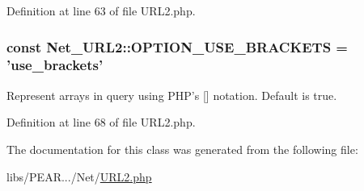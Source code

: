 Definition at line 63 of file U\-R\-L2.\-php.

\hypertarget{classNet__URL2_a864182f067e5df22055afc3a0dfe5a57}{
\subsubsection[{O\-P\-T\-I\-O\-N\-\_\-\-U\-S\-E\-\_\-\-B\-R\-A\-C\-K\-E\-T\-S}]{\setlength{\rightskip}{0pt plus 5cm}const Net\-\_\-\-U\-R\-L2\-::\-O\-P\-T\-I\-O\-N\-\_\-\-U\-S\-E\-\_\-\-B\-R\-A\-C\-K\-E\-T\-S = 'use\-\_\-brackets'}}\label{classNet__URL2_a864182f067e5df22055afc3a0dfe5a57}
Represent arrays in query using P\-H\-P's \mbox{[}\mbox{]} notation. Default is true. 

Definition at line 68 of file U\-R\-L2.\-php.



The documentation for this class was generated from the following file\-:\begin{DoxyCompactItemize}
\item 
libs/\-P\-E\-A\-R.../\-Net/\hyperlink{URL2_8php}{U\-R\-L2.\-php}\end{DoxyCompactItemize}
